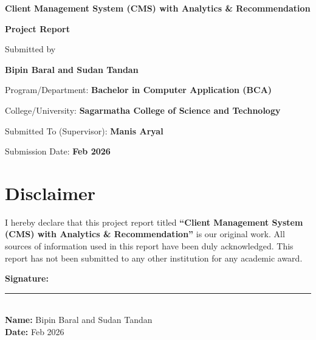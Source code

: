\documentclass[12pt,a4paper]{report}
\newcommand{\ProjectTitle}{Client Management System (CMS) with Analytics \& Recommendation}
\newcommand{\SubmittedBy}{Bipin Baral and Sudan Tandan}
\newcommand{\ProgramName}{Bachelor in Computer Application (BCA)}
\newcommand{\InstitutionName}{Sagarmatha College of Science and Technology}
\newcommand{\SupervisorName}{Manis Aryal}
\newcommand{\SubmissionDate}{Feb 2026}
\begin{document}
\begin{titlepage}
  \centering
  \vspace*{1.0cm}

  {\Large \textbf{\ProjectTitle} \par}
  \vspace{0.4cm}
  {\large \textbf{Project Report} \par}

  \vspace{1.2cm}

  {\large Submitted by \par}
  \vspace{0.2cm}
  {\large \textbf{\SubmittedBy} \par}

  \vspace{0.8cm}
  {\large Program/Department: \textbf{\ProgramName} \par}
  \vspace{0.2cm}
  {\large College/University: \textbf{\InstitutionName} \par}

  \vspace{0.8cm}
  {\large Submitted To (Supervisor): \textbf{\SupervisorName} \par}

  \vfill
  {\large Submission Date: \textbf{\SubmissionDate} \par}
\end{titlepage}


\chapter*{Disclaimer}
I hereby declare that this project report titled \textbf{``Client Management System (CMS) with Analytics \& Recommendation''} is our original work. All sources of information used in this report have been duly acknowledged. This report has not been submitted to any other institution for any academic award.

\vspace{1cm}
\noindent \textbf{Signature:} \rule{6cm}{0.4pt}\\
\textbf{Name:} \SubmittedBy\\
\textbf{Date:} \SubmissionDate

\end{document}
